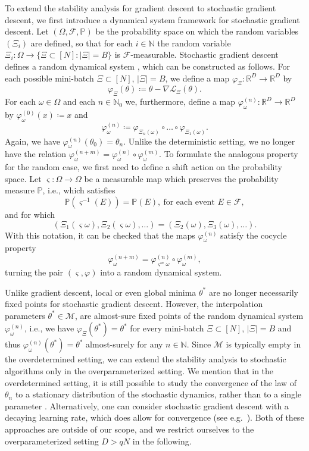 \documentclass[10pt]{article}
\newcommand{\R}{{\mathbb R}}
\newcommand{\N}{{\mathbb N}}
\def\R{\mathbb{R}}
\def\N{\mathbb{N}}
\begin{document}
To extend the stability analysis for gradient descent to stochastic gradient descent, we first introduce a dynamical system framework for stochastic gradient descent. Let $(\Omega, \mathcal F, \mathbb P)$ be the probability space on which the random variables $(\Xi_i)$ are defined, so that for each $i\in \N$ the random variable
$\Xi_i: \Omega \to \{\Xi\subset [N] : |\Xi| = B \}$
is $\mathcal F$-measurable. Stochastic gradient descent defines a random dynamical system \cite{Arnold98}, which can be constructed as follows. For each possible mini-batch $\Xi \subset [N]$, $|\Xi| = B$, we define a map $\varphi_\Xi: \R^D\to \R^D$ by
$$\varphi_\Xi(\theta) \coloneqq \theta - \nabla \mathcal L_{\Xi}(\theta).$$
For each $\omega \in \Omega$ and each $n \in \mathbb N_0$ we, furthermore, define a map $\varphi_\omega^{(n)}: \R^D \to \R^D$ by $\varphi_\omega^{(0)}(x) \coloneqq x$ and 
$$\varphi^{(n)}_\omega \coloneqq \varphi_{\Xi_n(\omega)} \circ \dots \circ \varphi_{\Xi_1(\omega)}.$$
Again, we have $\varphi^{(n)}_\omega(\theta_0) = \theta_n$.
Unlike the deterministic setting, we no longer have the relation $\varphi^{(n+m)}_\omega = \varphi^{(n)}_\omega \circ \varphi^{(m)}_\omega$. To formulate the analogous property for the random case, we first need to define a shift action on the probability space. Let $\varsigma: \Omega \to \Omega$ be a measurable map which preserves the probability measure $\mathbb P$, i.e., which satisfies 
$$\mathbb P(\varsigma^{-1}(E)) = \mathbb P(E),~\text{for each event } E\in \mathcal F,$$
and for which
$$(\Xi_1(\varsigma \omega), \Xi_2(\varsigma \omega), \dots) = (\Xi_2(\omega), \Xi_3(\omega), \dots).$$
With this notation, it can be checked that the maps $\varphi^{(n)}_\omega$ satisfy the cocycle property
$$\varphi^{(n+m)}_\omega = \varphi^{(n)}_{\varsigma^m\omega} \circ \varphi^{(m)}_\omega,$$
turning the pair $(\varsigma, \varphi)$ into a random dynamical system.

Unlike gradient descent, local or even global minima $\theta^*$ are no longer necessarily fixed points for stochastic gradient descent. However, the interpolation parameters $\theta^* \in \mathcal M$, are almost-sure fixed points of the random dynamical system $\varphi_\omega^{(n)}$, i.e., we have $\varphi_\Xi(\theta^*) = \theta^*$ for every mini-batch $\Xi \subset [N]$, $|\Xi| = B$ and thus $\varphi_\omega^{(n)}(\theta^*)= \theta^*$ almost-surely for any $n \in \N$. Since $\mathcal M$ is typically empty in the overdetermined setting, we can extend the stability analysis to stochastic algorithms only in the overparameterized setting. We mention that in the overdetermined setting, it is still possible to study the convergence of the law of $\theta_n$ to a stationary distribution of the stochastic dynamics, rather than to a single parameter \cite{Gurbuzbalaban21}. Alternatively, one can consider stochastic gradient descent with a decaying learning rate, which does allow for convergence (see e.g.~\cite{Benaim96, Fehrman20}). Both of these approaches are outside of our scope, and we restrict ourselves to the overparameterized setting $D>qN$ in the following.
\end{document}

